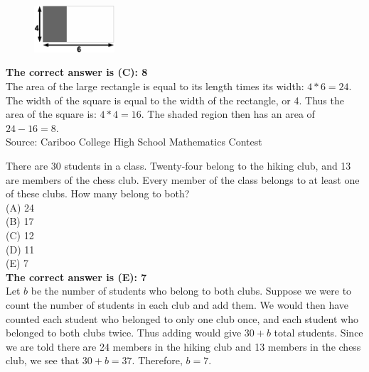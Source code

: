 \documentclass{article}
\begin{document}
\begin{figure}
	\includegraphics[width=30mm,viewport=17 290 402 516]{CCJPR73-7pic.eps}
\end{figure}

\textbf{The correct answer is (C): 8}\\[1ex]
The area of the large rectangle is equal to its length times its width: $4*6=24$.  The width of the square is equal to the width of the rectangle, or 4. Thus the area of the square is: $4*4=16$. The shaded region then has an area of $24-16=8$.
\\[5 ex]

\scriptsize
Source: Cariboo College High School Mathematics Contest

\normalsize
There are 30 students in a class. Twenty-four belong to the hiking club, and 13 are members of the chess club. Every member of the class belongs to at least one of these clubs. How many belong to both?\\
(A) 24\\
(B) 17\\
(C) 12\\
(D) 11\\
(E) 7\\


\textbf{The correct answer is (E): 7}\\[1 ex]
Let $b$ be the number of students who belong to both clubs. Suppose we were to count the number of students in each club and add them. We would then have counted each student who belonged to only one club once, and each student who belonged to both clubs twice. Thus adding would give $30+b$ total students.  Since we are told there are 24 members in the hiking club and 13 members in the chess club, we see that $30+b=37$.  Therefore, $b=7$.
\\[5 ex]
\end{document}
